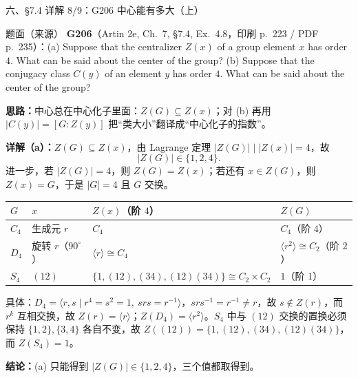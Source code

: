 \documentclass[aspectratio=169,10pt,fontset=none]{ctexbeamer}
\newcommand{\ex}[1]{\textcolor{accent}{\footnotesize\bfseries #1}}
\newcommand{\key}[1]{\textcolor{ink}{\bfseries #1}}
\begin{document}
\begin{frame}[t]{六、\S7.4 详解 8/9：G206 中心能有多大（上）}
\label{ex:G206}
\scriptsize
\begin{block}{\footnotesize 题面（来源）}
\ex{G206}（Artin 2e, Ch.~7, \S7.4, Ex.~4.8，印刷 p.~223 / PDF p.~235）：(a) Suppose that the centralizer $Z(x)$ of a group element $x$ has order $4$. What can be said about the center of the group? (b) Suppose that the conjugacy class $C(y)$ of an element $y$ has order $4$. What can be said about the center of the group?
\end{block}
\key{思路：}中心总在中心化子里面：$Z(G)\subseteq Z(x)$；对 (b) 再用 $|C(y)|=[G:Z(y)]$ 把“类大小”翻译成“中心化子的指数”。

\key{详解（a）：}$Z(G)\subseteq Z(x)$，由 Lagrange 定理 $|Z(G)|\mid|Z(x)|=4$，故
\[ |Z(G)|\in\{1,2,4\}. \]
进一步，若 $|Z(G)|=4$，则 $Z(G)=Z(x)$；若还有 $x\in Z(G)$，则 $Z(x)=G$，于是 $|G|=4$ 且 $G$ 交换。
\begin{center}
\renewcommand{\arraystretch}{1.08}
\begin{tabular}{@{}l l l l@{}}
\toprule
$G$ & $x$ & $Z(x)$（阶 $4$） & $Z(G)$\\
\midrule
$C_4$ & 生成元 $r$ & $C_4$ & $C_4$（阶 $4$）\\
$D_4$ & 旋转 $r$（$90^\circ$） & $\langle r\rangle\cong C_4$ & $\langle r^2\rangle\cong C_2$（阶 $2$）\\
$S_4$ & $(12)$ & $\{1,(12),(34),(12)(34)\}\cong C_2\times C_2$ & $1$（阶 $1$）\\
\bottomrule
\end{tabular}
\end{center}
具体：$D_4=\langle r,s\mid r^4=s^2=1,\ srs=r^{-1}\rangle$，$srs^{-1}=r^{-1}\ne r$，故 $s\notin Z(r)$，而 $r^k$ 互相交换，故 $Z(r)=\langle r\rangle$；$Z(D_4)=\langle r^2\rangle$。$S_4$ 中与 $(12)$ 交换的置换必须保持 $\{1,2\},\{3,4\}$ 各自不变，故 $Z((12))=\{1,(12),(34),(12)(34)\}$，而 $Z(S_4)=1$。

\key{结论：}(a) 只能得到 $|Z(G)|\in\{1,2,4\}$，三个值都取得到。
\end{frame}
\end{document}
